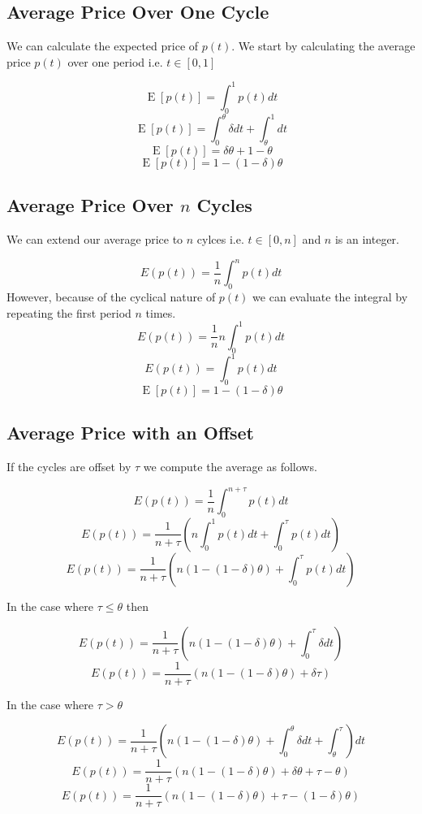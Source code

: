 \documentclass{article}
\DeclareMathOperator{\E}{\mathrm{E}}
\begin{document}
\subsection{Average Price Over One Cycle}

We can calculate the expected price of $p(t)$. We start by calculating the average price $p(t)$ over one period i.e. $t\in[0,1]$

$$\E[p(t)] = \int_{0}^{1} p(t) dt $$
$$\E[p(t)] = \int_{0}^{\theta} \delta dt + \int_{\theta}^{1} dt$$
$$\E[p(t)] = \delta \theta + 1 - \theta $$
$$\E[p(t)] = 1 - (1-\delta)\theta $$

\subsection{Average  Price Over $n$ Cycles}

We can extend our average price to $n$ cylces i.e. $t\in[0,n]$ and $n$ is an integer. 

$$E(p(t)) = \frac{1}{n} \int_{0}^{n} p(t) dt $$
However, because of the cyclical nature of $p(t)$ we can evaluate the integral by repeating the first period $n$ times.
$$E(p(t)) = \frac{1}{n} n \int_{0}^{1} p(t) dt $$
$$E(p(t)) = \int_{0}^{1} p(t) dt $$
$$\E[p(t)] = 1 - (1-\delta)\theta $$

\subsection{Average  Price with an Offset}

If the cycles are offset by $\tau$ we compute the average as follows.

$$E(p(t)) = \frac{1}{n} \int_{0}^{n+\tau} p(t) dt $$
$$E(p(t)) = \frac{1}{n+\tau} (n \int_{0}^{1} p(t) dt +  \int_{0}^{\tau} p(t) dt) $$
$$E(p(t)) = \frac{1}{n+\tau} (n (1 - (1-\delta)\theta) + \int_{0}^{\tau} p(t) dt)$$

In the case where $\tau \leq \theta$ then

$$E(p(t)) = \frac{1}{n+\tau} (n (1 - (1-\delta)\theta) + \int_{0}^{\tau} \delta dt)$$
$$E(p(t)) = \frac{1}{n+\tau} (n (1 - (1-\delta)\theta) + \delta\tau)$$

In the case where $\tau > \theta$

$$E(p(t)) = \frac{1}{n+\tau} ( n(1 - (1-\delta)\theta) + \int_{0}^{\theta} \delta dt + \int_{\theta}^{\tau}) dt $$
$$E(p(t)) = \frac{1}{n+\tau} (n (1 - (1-\delta)\theta) + \delta \theta + \tau - \theta) $$
$$E(p(t)) = \frac{1}{n+\tau} (n (1 - (1-\delta)\theta) + \tau - (1-\delta)\theta ) $$
\end{document}
